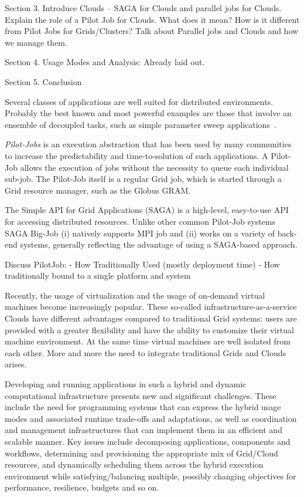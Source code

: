 \documentclass[conference,final]{IEEEtran}
\newcommand{\up}{\vspace*{-1em}}
\begin{document}
\bigskip 

Section 3. Introduce Clouds -- SAGA for Clouds and parallel jobs for
Clouds. Explain the role of a Pilot Job for Clouds. What does it mean?
How is it different from Pilot Jobs for Grids/Clusters?  Talk about
Parallel jobs and Clouds and how we manage them.

\bigskip 

Section 4. Usage Modes and Analysis: Already laid out.

\bigskip 
Section 5. Conclusion


Several classes of applications are well suited for distributed
environments. Probably the best known and most powerful examples are
those that involve an ensemble of decoupled tasks, such as simple
parameter sweep applications~\cite{1239909}.

\emph{Pilot-Jobs} is an execution abstraction that 
has been used by many communities to increase the predictability and
time-to-solution of such applications. A Pilot-Job allows the
execution of jobs without the necessity to queue each individual
sub-job. The Pilot-Job itself is a regular Grid job, which is started
through a Grid resource manager, such as the Globus GRAM.

The Simple API for Grid Applications (SAGA) is a high-level,
easy-to-use API for accessing distributed resources. Unlike other
common Pilot-Job systems SAGA Big-Job (i) natively supports MPI job and
(ii) works on a variety of back-end systems, generally reflecting the
advantage of using a SAGA-based approach.

Discuss PilotJob:
- How Traditionally Used (mostly deployment time)
- How traditionally bound to a single platform and system

Recently, the usage of virtualization and the usage of on-demand
virtual machines become increasingly popular. These so-called
infrastructure-as-a-service Clouds have different advantages compared
to traditional Grid systems: users are provided with a greater
flexibility and have the ability to customize their virtual machine
environment. At the same time virtual machines are well isolated from
each other. More and more the need to integrate traditional Grids and
Clouds arises.

Developing and running applications in such a hybrid and dynamic computational 
infrastructure presents new and significant challenges. These include the need for programming 
systems that can express the hybrid usage modes and associated runtime trade-offs and adaptations, 
as well as coordination and management infrastructures that can implement them in an efficient 
and scalable manner. Key issues include decomposing applications, components and workflows, 
determining and provisioning the appropriate mix of Grid/Cloud resources, and dynamically scheduling 
them across the hybrid execution environment while satisfying/balancing multiple, possibly changing 
objectives for performance, resilience, budgets and so on.
\end{document}
